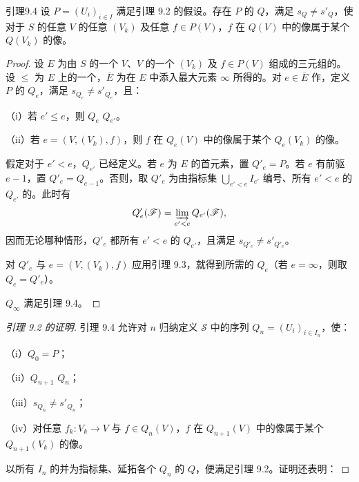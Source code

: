 \begin{SGAresult}{引理}{9.4}
设 $P=(U_i)_{i\in I}$ 满足引理 9.2 的假设。存在 $P$ 的 $Q$，满足 $s_Q\ne s'_Q$，使对于 $S$ 的任意 $V$ 的任意 $(V_k)$ 及任意 $f\in P(V)$，$f$ 在 $Q(V)$ 中的像属于某个 $Q(V_k)$ 的像。
\end{SGAresult}
\begin{proof}
设 $E$ 为由 $S$ 的一个 $V$、$V$ 的一个 $(V_k)$ 及 $f\in P(V)$ 组成的三元组的。设 $\leq$ 为 $E$ 上的一个，$\overline E$ 为在 $E$ 中添入最大元素 $\infty$ 所得的。对 $e\in\overline E$ 作，定义 $P$ 的 $Q_e$，满足 $s_{Q_e}\ne s'_{Q_e}$，且：

（i）若 $e'\leq e$，则 $Q_e$  $Q_{e'}$。

（ii）若 $e=(V,(V_k),f)$，则 $f$ 在 $Q_e(V)$ 中的像属于某个 $Q_e(V_k)$ 的像。

假定对于 $e'<e$，$Q_{e'}$ 已经定义。若 $e$ 为 $E$ 的首元素，置 $Q'_e=P$。若 $e$ 有前驱 $e-1$，置 $Q'_e=Q_{e-1}$。否则，取 $Q'_e$ 为由指标集 $\bigcup_{e'<e}I_{e'}$ 编号、所有 $e'<e$ 的 $Q_{e'}$ 的。此时有
\[
 Q'_e(\mathscr F)=\varinjlim_{e'<e}Q_{e'}(\mathscr F),
\]
因而无论哪种情形，$Q'_e$ 都所有 $e'<e$ 的 $Q_{e'}$，且满足 $s_{Q'_e}\ne s'_{Q'_e}$。

对 $Q'_e$ 与 $e=(V,(V_k),f)$ 应用引理 9.3，就得到所需的 $Q_e$（若 $e=\infty$，则取 $Q_e=Q'_e$）。

 $Q_\infty$ 满足引理 9.4。
\end{proof}
\begin{proof}[引理 9.2 的证明]
引理 9.4 允许对 $n$ 归纳定义 $\mathscr S$ 中的序列 $Q_n=(U_i)_{i\in I_n}$，使：

（i）$Q_0=P$；

（ii）$Q_{n+1}$  $Q_n$；

（iii）$s_{Q_n}\ne s'_{Q_n}$；

（iv）对任意 $f_k:V_k\to V$ 与 $f\in Q_n(V)$，$f$ 在 $Q_{n+1}(V)$ 中的像属于某个 $Q_{n+1}(V_k)$ 的像。

以所有 $I_n$ 的并为指标集、延拓各个 $Q_n$ 的 $Q$，便满足引理 9.2。证明还表明：
\end{proof}

